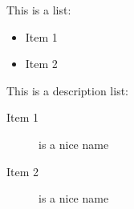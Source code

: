 \begin{Results}
This is a list:
\begin{itemize}
\item Item 1
\item Item 2
\end{itemize}

This is a description list:
\begin{description}
\item[Item 1] is a nice name
\item[Item 2] is a nice name
\end{description}
\end{Results}
